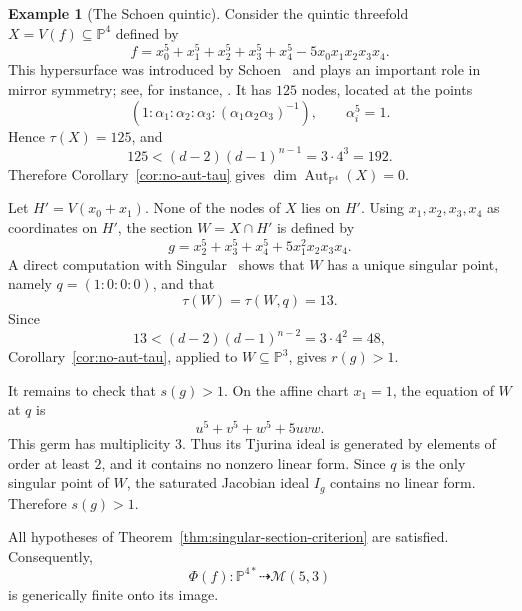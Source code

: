 \documentclass[11pt]{amsart}
\theoremstyle{plain}
\theoremstyle{definition}
\newtheorem{ex}[subsection]{Example}
\numberwithin{equation}{section}
\newcommand{\M}{{\mathcal M}}
\newcommand{\PP}{\mathbb{P}}
\DeclareMathOperator{\Aut}{Aut}
\begin{document}
\begin{ex}[The Schoen quintic]
\label{ex:schoen-quintic}
Consider the quintic threefold $X=V(f)\subseteq\PP^4$ defined by
\[
f=x_0^5+x_1^5+x_2^5+x_3^5+x_4^5-5x_0x_1x_2x_3x_4.
\]
This hypersurface was introduced by Schoen~\cite{Schoen} and plays an important
role in mirror symmetry; see, for instance, \cite{C}. It has $125$ nodes, located
at the points
\[
(1:\alpha_1:\alpha_2:\alpha_3:(\alpha_1\alpha_2\alpha_3)^{-1}),
\qquad \alpha_i^5=1.
\]
Hence $\tau(X)=125$, and
\[
125< (d-2)(d-1)^{n-1}=3\cdot4^3=192.
\]
Therefore Corollary~\ref{cor:no-aut-tau} gives
$\dim\Aut_{\PP^4}(X)=0$.

Let $H'=V(x_0+x_1)$. None of the nodes of $X$ lies on $H'$. Using
$x_1,x_2,x_3,x_4$ as coordinates on $H'$, the section $W=X\cap H'$ is defined by
\[
g=x_2^5+x_3^5+x_4^5+5x_1^2x_2x_3x_4.
\]
A direct computation with {\sc Singular}~\cite{Sing} shows that $W$ has a unique
singular point, namely $q=(1:0:0:0)$,
and that
\[
\tau(W)=\tau(W,q)=13.
\]
Since
\[
13<(d-2)(d-1)^{n-2}=3\cdot4^2=48,
\]
Corollary~\ref{cor:no-aut-tau}, applied to $W\subseteq\PP^3$, gives
$r(g)>1$.

It remains to check that $s(g)>1$. On the affine chart $x_1=1$, the equation of
$W$ at $q$ is
\[
u^5+v^5+w^5+5uvw.
\]
This germ has multiplicity $3$. Thus its Tjurina ideal is generated by elements
of order at least $2$, and it contains no nonzero linear form. Since $q$ is the
only singular point of $W$, the saturated Jacobian ideal $I_g$ contains no linear
form. Therefore $s(g)>1$.

All hypotheses of Theorem~\ref{thm:singular-section-criterion} are satisfied.
Consequently,
\[
\Phi(f):\PP^{4*}\dashrightarrow \M(5,3)
\]
is generically finite onto its image.
\end{ex}
\end{document}
